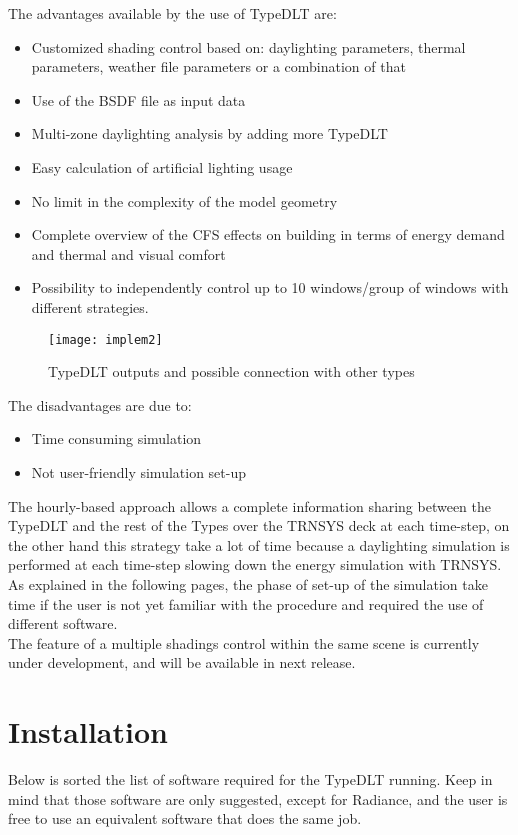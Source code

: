 The advantages available by the use of TypeDLT are: 
\begin{itemize}
\renewcommand{\labelitemi}{\tiny$\blacksquare$}
\item Customized shading control based on: daylighting parameters, thermal parameters, weather file parameters or a combination of that
\item Use of the BSDF file as input data
\item Multi-zone daylighting analysis by adding more TypeDLT 
\item Easy calculation of artificial lighting usage
\item No limit in the complexity of the model geometry 
\item Complete overview of the CFS effects on building in terms of energy demand and thermal and visual comfort
\item Possibility to independently control up to 10 windows/group of windows with different strategies.
\end{itemize}

\begin{figure}[h]
\centering
\texttt{[image: implem2]}
\caption{\label{img2:implem} TypeDLT outputs and possible connection with other types}
\end{figure}

The disadvantages are due to:
\begin{itemize}
\renewcommand{\labelitemi}{\tiny$\blacksquare$}
\item Time consuming simulation
\item Not user-friendly simulation set-up
\end{itemize}

The hourly-based approach allows a complete information sharing between the TypeDLT and the rest of the Types over the TRNSYS deck at each time-step, on the other hand this strategy take a lot of time because a daylighting simulation is performed at each time-step slowing down the energy simulation with TRNSYS.\\
As explained in the following pages, the phase of set-up of the simulation take time if the user is not yet familiar with the procedure and required the use of different software.\\
The feature of a multiple shadings control within the same scene is currently under development, and will be available in next release.

\section{Installation}
Below is sorted the list of software required for the TypeDLT running. Keep in mind that those software are only suggested, except for Radiance, and the user is free to use an equivalent software that does the same job.

